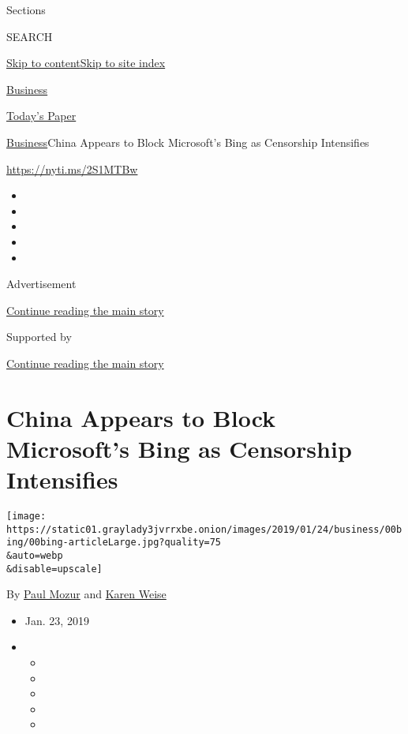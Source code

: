 Sections

SEARCH

\protect\hyperlink{site-content}{Skip to
content}\protect\hyperlink{site-index}{Skip to site index}

\href{https://www.nytimes3xbfgragh.onion/section/business}{Business}

\href{https://myaccount.nytimes3xbfgragh.onion/auth/login?response_type=cookie\&client_id=vi}{}

\href{https://www.nytimes3xbfgragh.onion/section/todayspaper}{Today's
Paper}

\href{/section/business}{Business}\textbar{}China Appears to Block
Microsoft's Bing as Censorship Intensifies

\url{https://nyti.ms/2S1MTBw}

\begin{itemize}
\item
\item
\item
\item
\item
\end{itemize}

Advertisement

\protect\hyperlink{after-top}{Continue reading the main story}

Supported by

\protect\hyperlink{after-sponsor}{Continue reading the main story}

\hypertarget{china-appears-to-block-microsofts-bing-as-censorship-intensifies}{%
\section{China Appears to Block Microsoft's Bing as Censorship
Intensifies}\label{china-appears-to-block-microsofts-bing-as-censorship-intensifies}}

\texttt{[image: https://static01.graylady3jvrrxbe.onion/images/2019/01/24/business/00bing/00bing-articleLarge.jpg?quality=75\\\&auto=webp\\\&disable=upscale]}

By \href{https://www.nytimes3xbfgragh.onion/by/paul-mozur}{Paul Mozur}
and \href{https://www.nytimes3xbfgragh.onion/by/karen-weise}{Karen
Weise}

\begin{itemize}
\item
  Jan. 23, 2019
\item
  \begin{itemize}
  \item
  \item
  \item
  \item
  \item
  \end{itemize}
\end{itemize}

